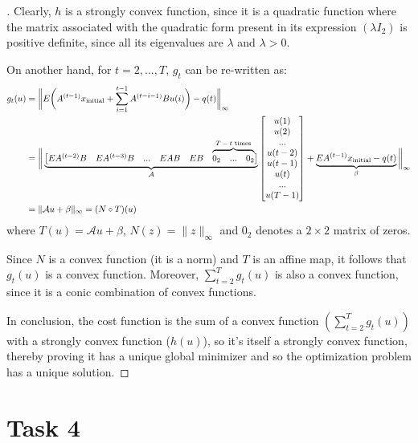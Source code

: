 \documentclass[12pt]{article}
\newcommand\overmat[2]{%
  \makebox[0pt][l]{$\smash{\color{black}\overbrace{\phantom{%
    \begin{matrix}#2\end{matrix}}}^{\text{\color{black}#1}}}$}#2}
\begin{document}
\begin{proof}[\unskip\nopunct]
Clearly, $h$ is a strongly convex function, since it is a quadratic function where the matrix associated with the quadratic form present in its expression $(\lambda I_2)$ is positive definite, since all its eigenvalues are $\lambda$ and $\lambda > 0$. \par
On another hand, for $t = 2, ..., T$, $g_t$ can be re-written as:
\begin{align*}
    g_t(u) &= \bigg\|E \bigg(A^{(t-1)} x_{\text{initial}} + \sum_{i=1}^{t-1} A^{(t - i-1)} B u(i)\bigg) - q(t)\bigg\|_{\infty} \\
    &= \bigg\|
    \underbrace{
    \begin{bmatrix}
        EA^{(t - 2)}B & EA^{(t - 3)}B & ... & EAB & EB &  \overmat{$T - t$ \text{times}}{0_2 & ... & 0_2}
    \end{bmatrix}
    }_{\mathcal{A}}
    \begin{bmatrix}
        u(1) \\ u(2) \\ ... \\ u(t - 2) \\ u(t - 1) \\ u(t) \\ ... \\ u(T -1)
    \end{bmatrix}
    + \underbrace{EA^{(t-1)} x_{\text{initial}} - q(t)}_{\beta}\bigg\|_{\infty} \\
    &= \| \mathcal{A}u + \beta \|_{\infty} = (N \circ T)(u)
\end{align*}
where $T(u) = \mathcal{A}u + \beta$, $N(z) = \|z\|_{\infty}$ and $0_2$ denotes a $2 \times 2$ matrix of zeros.\par
Since $N$ is a convex function (it is a norm) and $T$ is an affine map, it follows that $g_t(u)$ is a convex function. Moreover, $\sum_{t=2}^{T} g_t(u)$ is also a convex function, since it is a conic combination of convex functions.
\par
In conclusion, the cost function is the sum of a convex function $(\sum_{t=2}^{T} g_t(u))$ with a strongly convex function ($h(u)$), so it's itself a strongly convex function, thereby proving it has a unique global minimizer and so the optimization problem has a unique solution.
\end{proof}

\section{Task 4}
\end{document}
